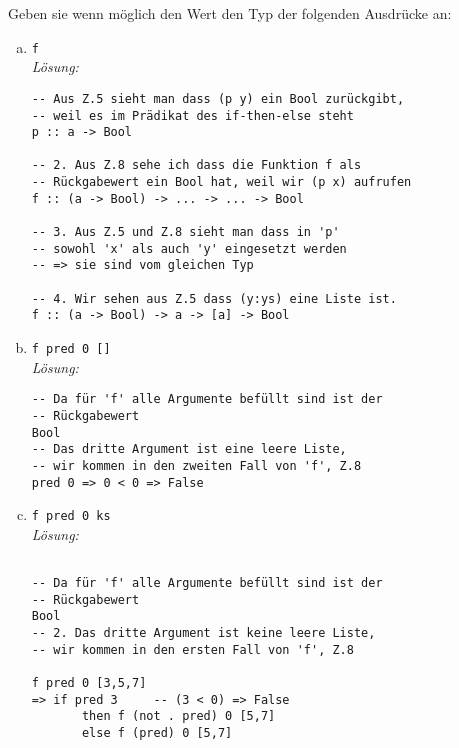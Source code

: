 \documentclass{article}
\begin{document}
Geben sie wenn möglich den Wert den Typ der folgenden Ausdrücke an:

\newpage

\begin{enumerate} [a)]
    \setlength\itemsep{3em}
    \item \texttt{f} \\[2mm]
    \textit{Lösung:}
    \begin{mdframed}[backgroundcolor=bg]
        \begin{verbatim}
-- Aus Z.5 sieht man dass (p y) ein Bool zurückgibt,
-- weil es im Prädikat des if-then-else steht
p :: a -> Bool

-- 2. Aus Z.8 sehe ich dass die Funktion f als
-- Rückgabewert ein Bool hat, weil wir (p x) aufrufen
f :: (a -> Bool) -> ... -> ... -> Bool

-- 3. Aus Z.5 und Z.8 sieht man dass in 'p' 
-- sowohl 'x' als auch 'y' eingesetzt werden
-- => sie sind vom gleichen Typ

-- 4. Wir sehen aus Z.5 dass (y:ys) eine Liste ist.
f :: (a -> Bool) -> a -> [a] -> Bool
        \end{verbatim}
    \end{mdframed}
    \item \texttt{f pred 0 []} \\[2mm]
    \textit{Lösung:}
    \begin{mdframed}[backgroundcolor=bg]
        \begin{verbatim}
-- Da für 'f' alle Argumente befüllt sind ist der
-- Rückgabewert
Bool
-- Das dritte Argument ist eine leere Liste,
-- wir kommen in den zweiten Fall von 'f', Z.8
pred 0 => 0 < 0 => False
        \end{verbatim}
    \end{mdframed}

\newpage

    \item \texttt{f pred 0 ks} \\[2mm]
    \textit{Lösung:}
    \begin{mdframed}[backgroundcolor=bg]
        \begin{verbatim}

-- Da für 'f' alle Argumente befüllt sind ist der
-- Rückgabewert
Bool
-- 2. Das dritte Argument ist keine leere Liste,
-- wir kommen in den ersten Fall von 'f', Z.8

f pred 0 [3,5,7]
=> if pred 3     -- (3 < 0) => False
       then f (not . pred) 0 [5,7]
       else f (pred) 0 [5,7]


\end{verbatim}
\end{mdframed}
\end{enumerate}
\end{document}
